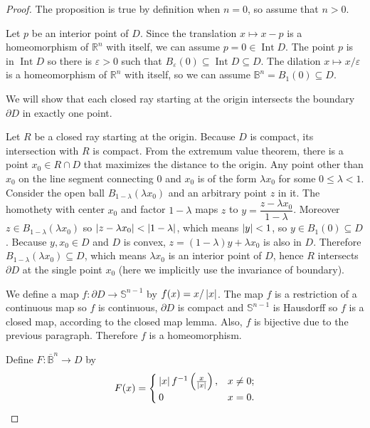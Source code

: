 \begin{proof}
	The proposition is true by definition when \( n = 0 \), so assume that \( n > 0 \).

	Let \( p \) be an interior point of \( D \). Since the translation \( x\mapsto x - p \) is a homeomorphism of \( \mathbb{R}^{n} \) with itself, we can assume \( p = 0 \in \operatorname{Int} D \). The point \( p \) is in \( \operatorname{Int} D \) so there is \( \varepsilon > 0 \) such that \( B_{\varepsilon}(0) \subseteq \operatorname{Int} D \subseteq D \). The dilation \( x\mapsto x/\varepsilon \) is a homeomorphism of \( \mathbb{R}^{n} \) with itself, so we can assume \( \mathbb{B}^{n} = B_{1}(0) \subseteq D \).

	We will show that each closed ray starting at the origin intersects the boundary \( \partial D \) in exactly one point.

	Let \( R \) be a closed ray starting at the origin. Because \( D \) is compact, its intersection with \( R \) is compact. From the extremum value theorem, there is a point \( x_{0} \in R\cap D \) that maximizes the distance to the origin. Any point other than \( x_{0} \) on the line segment connecting \( 0 \) and \( x_{0} \) is of the form \( \lambda x_{0} \) for some \( 0\leq \lambda < 1 \). Consider the open ball \( B_{1-\lambda}(\lambda x_{0}) \) and an arbitrary point \( z \) in it. The homothety with center \( x_{0} \) and factor \( 1 - \lambda \) maps \( z \) to \( y = \dfrac{z - \lambda x_{0}}{1 - \lambda} \). Moreover \( z \in B_{1 - \lambda}(\lambda x_{0}) \) so \( \left\vert{z - \lambda x_{0}}\right\vert < \left\vert{1 - \lambda}\right\vert \), which means \( \left\vert{y}\right\vert < 1 \), so \( y \in B_{1}(0) \subseteq D \). Because \( y, x_{0} \in D \) and \( D \) is convex, \( z = (1 - \lambda)y + \lambda x_{0} \) is also in \( D \). Therefore \( B_{1 - \lambda}(\lambda x_{0}) \subseteq D \), which means \( \lambda x_{0} \) is an interior point of \( D \), hence \( R \) intersects \( \partial D \) at the single point \( x_{0} \) (here we implicitly use the invariance of boundary).

	We define a map \( f: \partial D \to \mathbb{S}^{n-1} \) by \( f(x) = x/\left\vert{x}\right\vert \). The map \( f \) is a restriction of a continuous map so \( f \) is continuous, \( \partial D \) is compact and \( \mathbb{S}^{n-1} \) is Hausdorff so \( f \) is a closed map, according to the closed map lemma. Also, \( f \) is bijective due to the previous paragraph. Therefore \( f \) is a homeomorphism.

	Define \( F: \overline{\mathbb{B}}^{n} \to D \) by
	\begin{align*}
		F(x) = \begin{cases}
			       \left\vert{x}\right\vert f^{-1}\left(\frac{x}{\left\vert{x}\right\vert}\right), & x\ne 0; \\
			       0                                             & x = 0.
		       \end{cases}
	\end{align*}


\end{proof}
